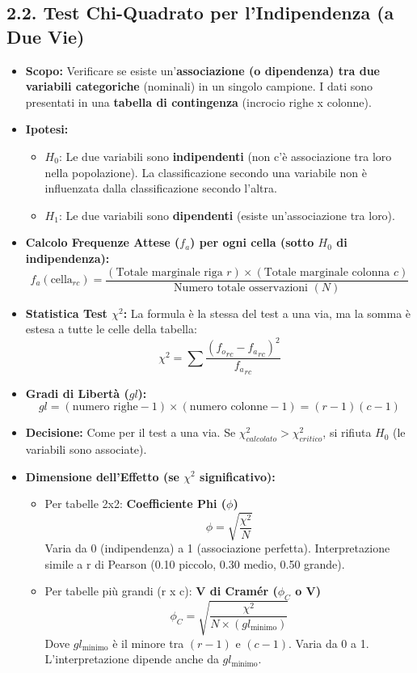 \documentclass[12pt, a4paper]{article}
\newcommand{\chisq}{\chi^2} %
\newcommand{\Hnull}{H_0} %
\newcommand{\Halt}{H_1} %
\newcommand{\df}{gl} %
\newcommand{\fo}{f_o} %
\newcommand{\fa}{f_a} %
\newcommand{\phiCoeff}{\phi} %
\newcommand{\phiCramer}{\phi_C} %
\begin{document}
\subsection*{2.2. Test Chi-Quadrato per l'Indipendenza (a Due Vie)}
\begin{itemize}
    \item \textbf{Scopo:} Verificare se esiste un'\textbf{associazione (o dipendenza) tra due variabili categoriche} (nominali) in un singolo campione. I dati sono presentati in una \textbf{tabella di contingenza} (incrocio righe x colonne).
    \item \textbf{Ipotesi:}
        \begin{itemize}
            \item $\Hnull$: Le due variabili sono \textbf{indipendenti} (non c'è associazione tra loro nella popolazione). La classificazione secondo una variabile non è influenzata dalla classificazione secondo l'altra.
            \item $\Halt$: Le due variabili sono \textbf{dipendenti} (esiste un'associazione tra loro).
        \end{itemize}
    \item \textbf{Calcolo Frequenze Attese ($\fa$) per ogni cella (sotto $\Hnull$ di indipendenza):}
        $$ \fa (\text{cella}_{rc}) = \frac{(\text{Totale marginale riga } r) \times (\text{Totale marginale colonna } c)}{\text{Numero totale osservazioni } (N)} $$
    \item \textbf{Statistica Test $\chisq$:} La formula è la stessa del test a una via, ma la somma è estesa a tutte le celle della tabella:
        $$ \chisq = \sum \frac{({\fo}_{rc} - {\fa}_{rc})^2}{{\fa}_{rc}} $$
    \item \textbf{Gradi di Libertà ($\df$):}
        $$ \df = (\text{numero righe} - 1) \times (\text{numero colonne} - 1) = (r-1)(c-1) $$
    \item \textbf{Decisione:} Come per il test a una via. Se $\chisq_{calcolato} > \chisq_{critico}$, si rifiuta $\Hnull$ (le variabili sono associate).
    \item \textbf{Dimensione dell'Effetto (se $\chisq$ significativo):}
        \begin{itemize}
            \item Per tabelle 2x2: \textbf{Coefficiente Phi ($\phiCoeff$)}
              $$ \phiCoeff = \sqrt{\frac{\chisq}{N}} $$
              Varia da 0 (indipendenza) a 1 (associazione perfetta). Interpretazione simile a r di Pearson (0.10 piccolo, 0.30 medio, 0.50 grande).
            \item Per tabelle più grandi (r x c): \textbf{V di Cramér ($\phiCramer$ o V)}
              $$ \phiCramer = \sqrt{\frac{\chisq}{N \times (\df_{\text{minimo}})}} $$
              Dove $\df_{\text{minimo}}$ è il minore tra $(r-1)$ e $(c-1)$. Varia da 0 a 1. L'interpretazione dipende anche da $\df_{\text{minimo}}$.
        \end{itemize}
\end{itemize}
\end{document}
